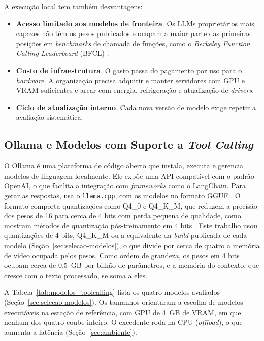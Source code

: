 A execução local tem também desvantagens:
\begin{itemize}
\item \textbf{Acesso limitado aos modelos de fronteira}. Os LLMs proprietários mais capazes não têm os pesos publicados e ocupam a maior parte das primeiras posições em \textit{benchmarks} de chamada de funções, como o \textit{Berkeley Function Calling Leaderboard} (BFCL) \cite{patil2025berkeley}.
\item \textbf{Custo de infraestrutura}. O gasto passa do pagamento por uso para o \textit{hardware}. A organização precisa adquirir e manter servidores com GPU e VRAM suficientes e arcar com energia, refrigeração e atualização de \textit{drivers}.
\item \textbf{Ciclo de atualização interno}. Cada nova versão de modelo exige repetir a avaliação sistemática.
\end{itemize}

\subsection{Ollama e Modelos com Suporte a \textit{Tool Calling}}

O Ollama \cite{ollama2023} é uma plataforma de código aberto que instala, executa e gerencia modelos de linguagem localmente. Ele expõe uma API compatível com o padrão OpenAI, o que facilita a integração com \textit{frameworks} como o LangChain. Para gerar as respostas, usa o \texttt{llama.cpp}, com os modelos no formato GGUF \cite{gguf2023}. O formato comporta quantizações como Q4\_0 e Q4\_K\_M, que reduzem a precisão dos pesos de 16 para cerca de 4 bits com perda pequena de qualidade, como mostram métodos de quantização pós-treinamento em 4 bits \cite{frantar2022gptq}. Este trabalho usou quantizações de 4 bits, Q4\_K\_M ou a equivalente da \textit{build} publicada de cada modelo (Seção~\ref{sec:selecao-modelos}), o que divide por cerca de quatro a memória de vídeo ocupada pelos pesos. Como ordem de grandeza, os pesos em 4 bits ocupam cerca de 0,5~GB por bilhão de parâmetros, e a memória do contexto, que cresce com o texto processado, se soma a eles.

A Tabela~\ref{tab:modelos_toolcalling} lista os quatro modelos avaliados (Seção~\ref{sec:selecao-modelos}). Os tamanhos orientaram a escolha de modelos executáveis na estação de referência, com GPU de 4~GB de VRAM, em que nenhum dos quatro coube inteiro. O excedente roda na CPU (\textit{offload}), o que aumenta a latência (Seção~\ref{sec:ambiente}).

